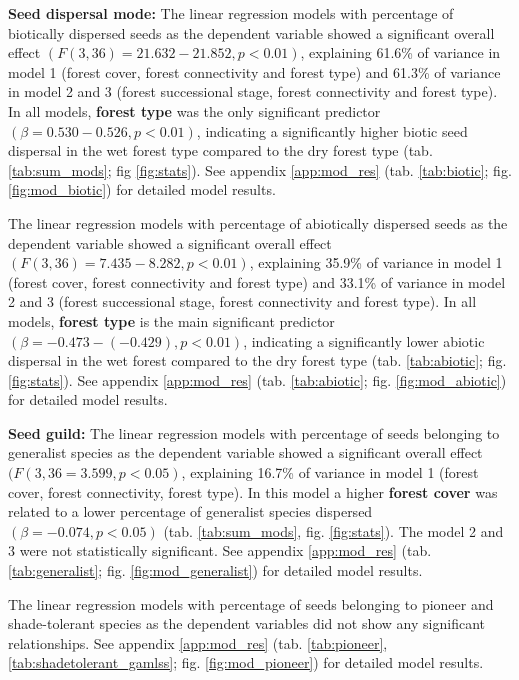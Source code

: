 \textbf{Seed dispersal mode:}
The linear regression models with percentage of biotically dispersed seeds as the dependent variable showed a significant overall effect $(F(3, 36) = 21.632 - 21.852, p < 0.01)$, explaining 61.6\% of variance in model 1 (forest cover, forest connectivity and forest type)  and 61.3\% of variance in model 2 and 3 (forest successional stage, forest connectivity and forest type). In all models, \textbf{forest type} was the only significant predictor $(\beta = 0.530 - 0.526, p < 0.01)$, indicating a significantly higher biotic seed dispersal in the wet forest type compared to the dry forest type (tab. \ref{tab:sum_mods}; fig \ref{fig:stats}). See appendix \ref{app:mod_res} (tab. \ref{tab:biotic}; fig. \ref{fig:mod_biotic}) for detailed model results.

The linear regression models with percentage of abiotically dispersed seeds as the dependent variable showed a significant overall effect $(F(3, 36) = 7.435 - 8.282, p<0.01)$, explaining 35.9\% of variance in model 1 (forest cover, forest connectivity and forest type) and 33.1\% of variance in model 2 and 3 (forest successional stage, forest connectivity and forest type). In all models, \textbf{forest type} is the main significant predictor $(\beta = -0.473 - (-0.429), p < 0.01)$, indicating a significantly lower abiotic dispersal in the wet forest compared to the dry forest type (tab. \ref{tab:abiotic}; fig. \ref{fig:stats}). See appendix \ref{app:mod_res} (tab. \ref{tab:abiotic}; fig. \ref{fig:mod_abiotic}) for detailed model results. 

\textbf{Seed guild:}
The linear regression models with percentage of seeds belonging to generalist species as the dependent variable showed a significant overall effect $(F(3, 36 = 3.599, p<0.05)$, explaining 16.7\% of variance in model 1 (forest cover, forest connectivity, forest type). In this model a higher \textbf{forest cover} was related to a lower percentage of generalist species dispersed $(\beta = -0.074, p < 0.05)$ (tab. \ref{tab:sum_mods}, fig. \ref{fig:stats}). The model 2 and 3 were not statistically significant. See appendix \ref{app:mod_res} (tab. \ref{tab:generalist}; fig. \ref{fig:mod_generalist}) for detailed model results. 

The linear regression models with percentage of seeds belonging to pioneer and shade-tolerant species as the dependent variables did not show any significant relationships. See appendix \ref{app:mod_res} (tab. \ref{tab:pioneer}, \ref{tab:shadetolerant_gamlss}; fig.  \ref{fig:mod_pioneer}) for detailed model results. 


